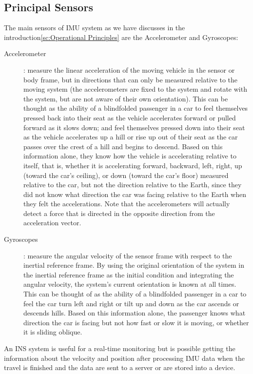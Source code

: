 \documentclass[tesi]{subfiles}
\begin{document}
\subsection{Principal Sensors}\label{ssc:Principal Sensors}
The main sensors of IMU system as we have discusses in the introduction\ref{sc:Operational Principles} are the Accelerometer and Gyroscopes:
\begin{description}

\item [Accelerometer]: measure the linear acceleration of the moving vehicle in the sensor or body frame, but in directions that can only be measured relative to the moving system (the accelerometers are fixed to the system and rotate with the system, but are not aware of their own orientation). This can be thought as the ability of a blindfolded passenger in a car to feel themselves pressed back into their seat as the vehicle accelerates forward or pulled forward as it slows down; and feel themselves pressed down into their seat as the vehicle accelerates up a hill or rise up out of their seat as the car passes over the crest of a hill and begins to descend. Based on this information alone, they know how the vehicle is accelerating relative to itself, that is, whether it is accelerating forward, backward, left, right, up (toward the car's ceiling), or down (toward the car's floor) measured relative to the car, but not the direction relative to the Earth, since they did not know what direction the car was facing relative to the Earth when they felt the accelerations.
Note that the accelerometers will actually detect a force that is directed in the opposite direction from the
 acceleration vector. 
\item [Gyroscopes]: measure the angular velocity of the sensor frame with respect to the inertial reference frame. By using the original orientation of the system in the inertial reference frame as the initial condition and integrating the angular velocity, the system's current orientation is known at all times. This can be thought of as the ability of a blindfolded passenger in a car to feel the car turn left and right or tilt up and down as the car ascends or descends hills. Based on this information alone, the passenger knows what direction the car is facing but not how fast or slow it is moving, or whether it is sliding oblique.

\end{description}


\noindent An INS system is useful for a real-time monitoring but is possible getting the information about the velocity and position after processing IMU data when the travel is finished and the data are sent to a server or are stored into a device.
\end{document}
